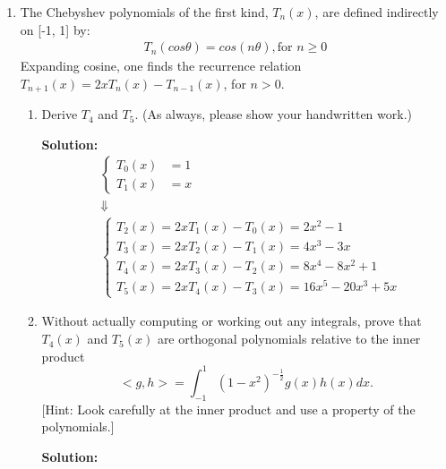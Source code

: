 \documentclass[conference,onecolumn]{IEEEtran}
\begin{document}
\begin{enumerate}[label=\arabic{enumi}.]
            \clearpage
      \item The Chebyshev polynomials of the first kind, $T_n(x)$, are defined indirectly on [-1, 1] by:
            \begin{align*}
                  T_n(cos \theta) = cos(n \theta), \text{for } n \geq 0
            \end{align*}
            Expanding cosine, one finds the recurrence relation $T_{n+1}(x) = 2xT_n(x)-T_{n-1}(x)$, for $n > 0$.
            \begin{enumerate}
                  \item Derive $T_4$ and $T_5$. (As always, please show your handwritten work.)

                        \textbf{Solution:}
                        \begin{align*}
                               & \begin{cases}
                                    T_0(x) & = 1 \\
                                    T_1(x) & = x
                              \end{cases} \\
                               & \Downarrow                 \\
                               & \begin{cases}
                                    T_2(x) = 2xT_1(x) - T_0(x) = 2x^2 - 1        \\
                                    T_3(x) = 2xT_2(x) - T_1(x) = 4x^3 - 3x       \\
                                    T_4(x) = 2xT_3(x) - T_2(x) = 8x^4 - 8x^2 + 1 \\
                                    T_5(x) = 2xT_4(x) - T_3(x) = 16x^5 - 20x^3 + 5x
                              \end{cases}
                        \end{align*}
                  \item Without actually computing or working out any integrals, prove that $T_4(x)$ and $T_5(x)$ are orthogonal polynomials relative to the inner product
                        $$
                              < g, h > = \int_{-1}^{1} (1 - x^2)^{-\frac{1}{2}}g(x)h(x)dx.
                        $$
                        [Hint: Look carefully at the inner product and use a property of the polynomials.]

                        \textbf{Solution:}


\end{enumerate}
\end{enumerate}
\end{document}
